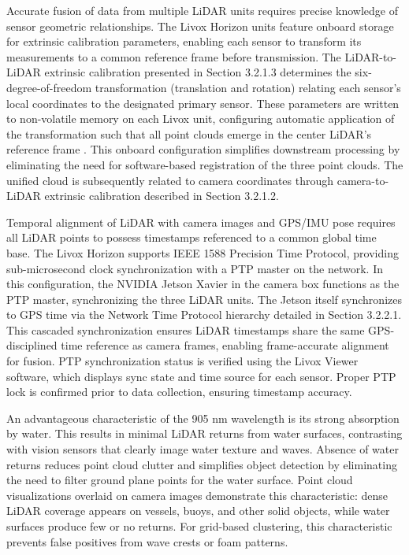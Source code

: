 \documentclass{erauthesis}
\begin{document}
Accurate fusion of data from multiple \ac{LiDAR} units requires precise knowledge of sensor geometric relationships.
The Livox Horizon units feature onboard storage for extrinsic calibration parameters, enabling each sensor to transform its measurements to a common reference frame before transmission.
The \ac{LiDAR}-to-\ac{LiDAR} extrinsic calibration presented in Section 3.2.1.3 determines the six-degree-of-freedom transformation (translation and rotation) relating each sensor's local coordinates to the designated primary sensor.
These parameters are written to non-volatile memory on each Livox unit, configuring automatic application of the transformation such that all point clouds emerge in the center \ac{LiDAR}'s reference frame \cite{thompson2023}.
This onboard configuration simplifies downstream processing by eliminating the need for software-based registration of the three point clouds.
The unified cloud is subsequently related to camera coordinates through camera-to-\ac{LiDAR} extrinsic calibration described in Section 3.2.1.2.

Temporal alignment of \ac{LiDAR} with camera images and \ac{GPS}/\ac{IMU} pose requires all \ac{LiDAR} points to possess timestamps referenced to a common global time base.
The Livox Horizon supports IEEE 1588 Precision Time Protocol, providing sub-microsecond clock synchronization with a \ac{PTP} master on the network.
In this configuration, the NVIDIA Jetson Xavier in the camera box functions as the \ac{PTP} master, synchronizing the three \ac{LiDAR} units.
The Jetson itself synchronizes to \ac{GPS} time via the Network Time Protocol hierarchy detailed in Section 3.2.2.1.
This cascaded synchronization ensures \ac{LiDAR} timestamps share the same \ac{GPS}-disciplined time reference as camera frames, enabling frame-accurate alignment for fusion.
\ac{PTP} synchronization status is verified using the Livox Viewer software, which displays sync state and time source for each sensor.
Proper \ac{PTP} lock is confirmed prior to data collection, ensuring timestamp accuracy.

An advantageous characteristic of the 905 nm wavelength is its strong absorption by water.
This results in minimal \ac{LiDAR} returns from water surfaces, contrasting with vision sensors that clearly image water texture and waves.
Absence of water returns reduces point cloud clutter and simplifies object detection by eliminating the need to filter ground plane points for the water surface.
Point cloud visualizations overlaid on camera images demonstrate this characteristic: dense \ac{LiDAR} coverage appears on vessels, buoys, and other solid objects, while water surfaces produce few or no returns.
For grid-based clustering, this characteristic prevents false positives from wave crests or foam patterns.
\end{document}
